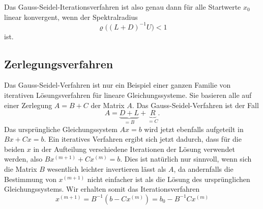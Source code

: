 Das Gauss-Seidel-Iterationsverfahren ist also genau dann für alle
Startwerte $x_0$ linear konvergent, wenn der Spektralradius
\[
\varrho\bigl( (L+D)^{-1}U \bigr) < 1
\]
ist.

\subsection{Zerlegungsverfahren
\label{buch:subsection:zerlegung}}
Das Gauss-Seidel-Verfahren ist nur ein Beispiel einer ganzen Familie
von iterativen Lösungsverfahren für lineare Gleichungssysteme.
Sie basieren alle auf einer Zerlegung $A=B+C$ der Matrix $A$.
Das Gauss-Seidel-Verfahren ist der Fall
\[
A = \underbrace{D+L}_{\displaystyle = B} + \underbrace{R}_{\displaystyle = C}.
\]
Das ursprüngliche Gleichungssystem $Ax=b$ wird jetzt ebenfalls
aufgeteilt in $Bx+Cx=b$.
Ein iteratives Verfahren ergibt sich jetzt dadurch, dass für die beiden $x$
in der Aufteilung verschiedene Iterationen der Lösung verwendet werden,
also $Bx^{(m+1)} + Cx^{(m)} = b$.
Dies ist natürlich nur sinnvoll, wenn sich die Matrix $B$ wesentlich
leichter invertieren lässt als $A$, da andernfalls die Bestimmung von
$x^{(m+1)}$ nicht einfacher ist als die Lösung des ursprünglichen
Gleichungssystems.
Wir erhalten somit das Iterationsverfahren
\begin{equation}
x^{(m+1)}
=
B^{-1}(b-Cx^{(m)})
=
b_0 - B^{-1}Cx^{(m)}
\end{equation}




